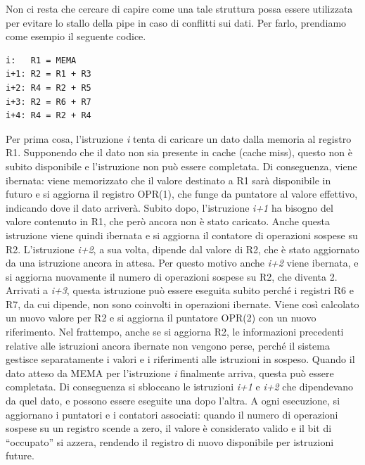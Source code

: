 Non ci resta che cercare di capire come una tale struttura possa essere utilizzata per evitare lo stallo della pipe in caso di conflitti sui dati. Per farlo, prendiamo come esempio il seguente codice.
\begin{lstlisting}
i:   R1 = MEMA
i+1: R2 = R1 + R3
i+2: R4 = R2 + R5
i+3: R2 = R6 + R7
i+4: R4 = R2 + R4
\end{lstlisting}
Per prima cosa, l'istruzione \textit{i} tenta di caricare un dato dalla memoria al registro R1. Supponendo che il dato non sia presente in cache (cache miss), questo non è subito disponibile e l'istruzione non può essere completata. Di conseguenza, viene ibernata: viene memorizzato che il valore destinato a R1 sarà disponibile in futuro e si aggiorna il registro OPR(1), che funge da puntatore al valore effettivo, indicando dove il dato arriverà. Subito dopo, l'istruzione \textit{i+1} ha bisogno del valore contenuto in R1, che però ancora non è stato caricato. Anche questa istruzione viene quindi ibernata e si aggiorna il contatore di operazioni sospese su R2. L’istruzione \textit{i+2}, a sua volta, dipende dal valore di R2, che è stato aggiornato da una istruzione ancora in attesa. Per questo motivo anche \textit{i+2} viene ibernata, e si aggiorna nuovamente il numero di operazioni sospese su R2, che diventa 2. Arrivati a \textit{i+3}, questa istruzione può essere eseguita subito perché i registri R6 e R7, da cui dipende, non sono coinvolti in operazioni ibernate. Viene così calcolato un nuovo valore per R2 e si aggiorna il puntatore OPR(2) con un nuovo riferimento. Nel frattempo, anche se si aggiorna R2, le informazioni precedenti relative alle istruzioni ancora ibernate non vengono perse, perché il sistema gestisce separatamente i valori e i riferimenti alle istruzioni in sospeso. Quando il dato atteso da MEMA per l'istruzione \textit{i} finalmente arriva, questa può essere completata. Di conseguenza si sbloccano le istruzioni \textit{i+1} e \textit{i+2} che dipendevano da quel dato, e possono essere eseguite una dopo l'altra. A ogni esecuzione, si aggiornano i puntatori e i contatori associati: quando il numero di operazioni sospese su un registro scende a zero, il valore è considerato valido e il bit di “occupato” si azzera, rendendo il registro di nuovo disponibile per istruzioni future.
\\
\\
